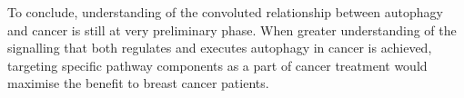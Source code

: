 To conclude, understanding of the convoluted relationship between autophagy and cancer is still at very preliminary phase. When greater understanding of the signalling that both regulates and executes autophagy in cancer is achieved, targeting specific pathway components as a part of cancer treatment would maximise the benefit to breast cancer patients.






 
 
 




